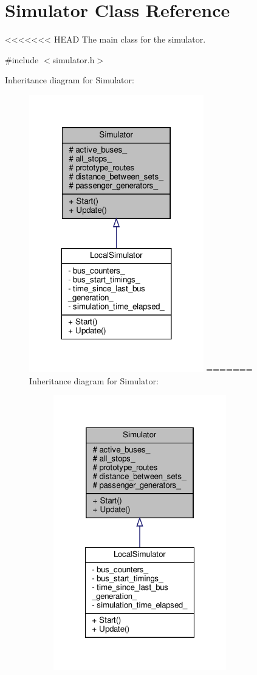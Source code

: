 \hypertarget{classSimulator}{}\section{Simulator Class Reference}
\label{classSimulator}


<<<<<<< HEAD
The main class for the simulator.  




{\ttfamily \#include $<$simulator.\+h$>$}



Inheritance diagram for Simulator\+:\nopagebreak
\begin{figure}[H]
\begin{center}
\leavevmode
\includegraphics[width=215pt]{classSimulator__inherit__graph}
=======
Inheritance diagram for Simulator\+:
\nopagebreak
\begin{figure}[H]
\begin{center}
\leavevmode
\includegraphics[width=213pt]{classSimulator__inherit__graph}

\end{center}
\end{figure}
\end{center}
\end{figure}
